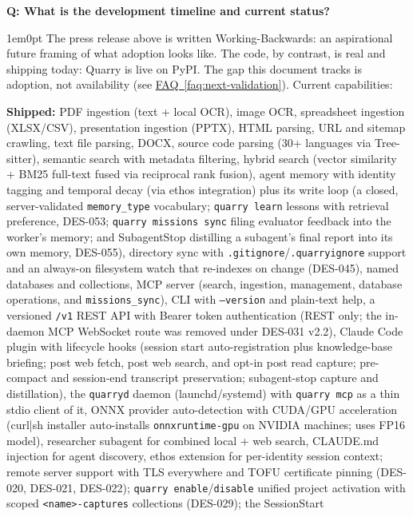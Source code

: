 \documentclass[11pt,letterpaper]{article}
\newcounter{faqnum}
\newenvironment{faqpair}[1]{%
  \needspace{4\baselineskip}%
  \vspace{0.5em}%
  \refstepcounter{faqnum}%
  \noindent\textbf{\color{SectionBlue}Q\thefaqnum: #1}\par\nopagebreak[4]%
  \vspace{0.2em}%
  \begin{adjustwidth}{1em}{0pt}%
  \setlength{\parindent}{0pt}%
}{%
  \end{adjustwidth}%
  \vspace{0.5em}%
}
\newcommand{\faqref}[1]{\hyperref[#1]{FAQ~\ref*{#1}}}
\begin{document}
\begin{faqpair}{What is the development timeline and current status?}\label{faq:timeline}
  The press release above is written Working-Backwards: an aspirational future
  framing of what adoption looks like. The code, by contrast, is real and
  shipping today: Quarry is live on PyPI. The gap this document
  tracks is adoption, not availability (see \faqref{faq:next-validation}).
  Current capabilities:

  \textbf{Shipped:} PDF ingestion (text + local OCR), image
  OCR, spreadsheet ingestion (XLSX/CSV), presentation ingestion (PPTX), HTML
  parsing, URL and sitemap crawling, text file parsing, DOCX, source code
  parsing (30+ languages via Tree-sitter), semantic search with metadata
  filtering, hybrid search (vector similarity + BM25 full-text fused via
  reciprocal rank fusion), agent memory with identity tagging and temporal
  decay (via ethos integration) plus its write loop (a closed, server-validated
  \texttt{memory\_type} vocabulary; \texttt{quarry learn} lessons with
  retrieval preference, DES-053; \texttt{quarry missions sync} filing
  evaluator feedback into the worker's memory; and SubagentStop distilling a
  subagent's final report into its own memory, DES-055), directory sync with
  \texttt{.gitignore}/\texttt{.quarryignore} support and an always-on
  filesystem watch that re-indexes on change (DES-045), named databases and
  collections, MCP server (search, ingestion, management, database
  operations, and \texttt{missions\_sync}), CLI with \texttt{--version} and
  plain-text help, a versioned \texttt{/v1} REST API with Bearer token
  authentication (REST only; the in-daemon MCP WebSocket route was removed
  under DES-031 v2.2), Claude Code plugin with lifecycle hooks
  (session start auto-registration plus knowledge-base briefing; post web
  fetch, post web search, and opt-in post read capture; pre-compact and
  session-end transcript preservation; subagent-stop capture and
  distillation), the \texttt{quarryd} daemon (launchd/systemd) with
  \texttt{quarry mcp} as a thin stdio client of it, ONNX provider
  auto-detection with CUDA/GPU acceleration (curl|sh installer auto-installs
  \texttt{onnxruntime-gpu} on NVIDIA machines; uses FP16 model), researcher
  subagent for combined local + web search, CLAUDE.md injection for agent
  discovery, ethos extension for per-identity session context; remote server
  support with TLS everywhere and TOFU certificate pinning (DES-020, DES-021,
  DES-022); \texttt{quarry enable}/\texttt{disable} unified project activation
  with scoped \texttt{<name>-captures} collections (DES-029); the SessionStart

\end{faqpair}
\end{document}
